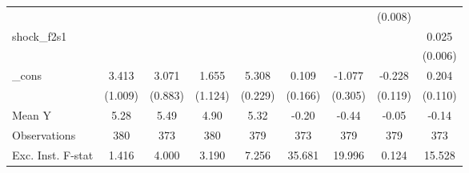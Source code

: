 {\begin{tabular}{l*{8}{c}}
            &                     &                     &                     &                     &                     &                     &     (0.008)         &                     \\
\addlinespace
shock\_f2s1  &                     &                     &                     &                     &                     &                     &                     &       0.025\sym{***}\\
            &                     &                     &                     &                     &                     &                     &                     &     (0.006)         \\
\addlinespace
\_cons      &       3.413\sym{***}&       3.071\sym{***}&       1.655         &       5.308\sym{***}&       0.109         &      -1.077\sym{***}&      -0.228\sym{*}  &       0.204\sym{*}  \\
            &     (1.009)         &     (0.883)         &     (1.124)         &     (0.229)         &     (0.166)         &     (0.305)         &     (0.119)         &     (0.110)         \\
\midrule
Mean Y      &        5.28         &        5.49         &        4.90         &        5.32         &       -0.20         &       -0.44         &       -0.05         &       -0.14         \\
Observations&         380         &         373         &         380         &         379         &         373         &         379         &         379         &         373         \\
Exc. Inst. F-stat&       1.416         &       4.000         &       3.190         &       7.256         &      35.681         &      19.996         &       0.124         &      15.528         \\
\bottomrule
\end{tabular}
}
